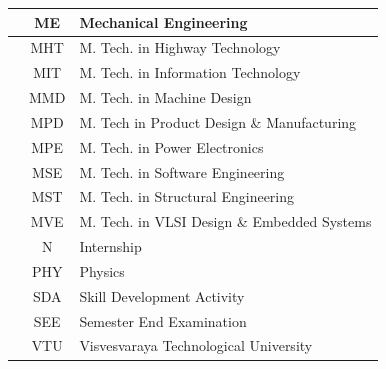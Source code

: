 \begin{longtable}{|c|c|p{12cm}|}
	\stepcounter{rowcount}\therowcount  & ME & Mechanical Engineering \\ \hline
	\stepcounter{rowcount}\therowcount  & MHT & M. Tech. in Highway Technology \\ \hline
	\stepcounter{rowcount}\therowcount  & MIT & M. Tech. in Information Technology \\ \hline
	\stepcounter{rowcount}\therowcount  & MMD & M. Tech. in Machine Design \\ \hline
	\stepcounter{rowcount}\therowcount  & MPD & M. Tech in Product Design \& Manufacturing \\ \hline
	\stepcounter{rowcount}\therowcount  & MPE & M. Tech. in Power Electronics \\ \hline
	\stepcounter{rowcount}\therowcount  & MSE & M. Tech. in Software Engineering \\ \hline
	\stepcounter{rowcount}\therowcount  & MST & M. Tech. in Structural Engineering \\ \hline
	\stepcounter{rowcount}\therowcount  & MVE & M. Tech. in VLSI Design \& Embedded Systems \\ \hline
	\stepcounter{rowcount}\therowcount  & N & Internship \\ \hline
	\stepcounter{rowcount}\therowcount  & PHY & Physics \\ \hline
	\stepcounter{rowcount}\therowcount  & SDA & Skill Development Activity \\ \hline
	\stepcounter{rowcount}\therowcount  & SEE & Semester End Examination \\ \hline
	\stepcounter{rowcount}\therowcount  & VTU & Visvesvaraya Technological University \\ \hline
	
\end{longtable}
\clearpage